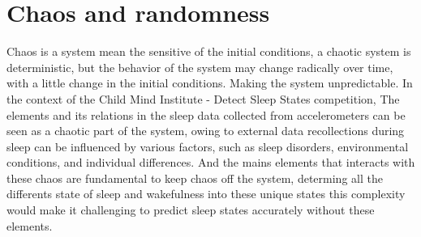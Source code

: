 \documentclass[conference]{IEEEtran}
\begin{document}
\section{Chaos and randomness}

Chaos is a system mean the sensitive of the initial conditions,
a chaotic system is deterministic, but the behavior of the system may change radically over time,
with a little change in the initial conditions. Making the system unpredictable.
In the context of the Child Mind Institute - Detect Sleep States competition, The elements and its relations
in the sleep data collected from accelerometers can be seen as a chaotic part of the system, owing to external data recollections
during sleep can be influenced by various factors, such as sleep disorders, environmental conditions, and individual differences.
And the mains elements that interacts with these chaos are fundamental to keep chaos off the system, 
determing all the differents state of sleep and wakefulness into these unique states this complexity would make it
challenging to predict sleep states accurately without these elements.
\end{document}
